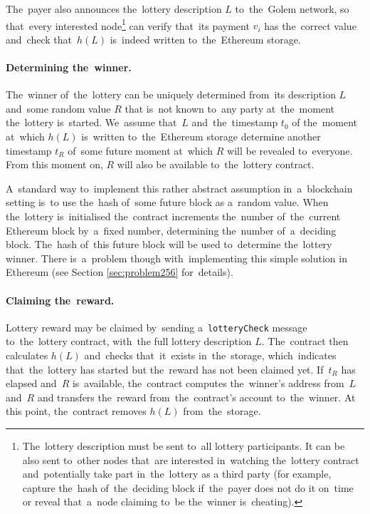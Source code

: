 \documentclass[a4paper]{article}
\newcommand{\lotteryhash}[1]{h({#1})}
\begin{document}
    The~payer also announces the~lottery description $L$ to~the~Golem network, so that~every interested
    node\footnote{ The~lottery description must be sent to~all lottery participants. It can be also sent to~other
    nodes that~are interested in~watching the~lottery contract and~potentially take part in~the~lottery as a
    third party (for example, capture the~hash of~the~deciding block if~the~payer does not do it on~time or reveal
    that~a~node claiming to~be the~winner is~cheating).}
    can verify that~its payment $v_i$ has the~correct value and~check that~$\lotteryhash{L}$ is~indeed written to~the~Ethereum
    storage.

    \paragraph{Determining the~winner.}
    The~winner of~the~lottery can be uniquely determined from~its description $L$ and~some random value $R$ that
    is~not known to~any party at~the~moment the~lottery is~started. We~assume that~$L$ and~the~timestamp $t_0$ of
    the~moment at~which $\lotteryhash{L}$ is~written to~the~Ethereum storage determine another timestamp $t_R$ of~some future
    moment at~which $R$ will be revealed to~everyone. From this moment on, $R$ will also be available to~the~lottery
    contract.

    A~standard way to~implement this rather abstract assumption in~a~blockchain setting is~to use the~hash of~some
    future block as a~random value. When the~lottery is~initialised the~contract increments the~number of~the~current
    Ethereum block by~a~fixed number, determining the~number of~a~deciding block. The~hash of~this future block will
    be used to~determine the~lottery winner. There is~a~problem though with~implementing this simple solution in
    Ethereum (see Section \ref{sec:problem256} for~details).

    \paragraph{Claiming the~reward.}
    Lottery reward may be claimed by~sending a~\texttt{lotteryCheck} message to~the~lottery contract, with~the
    full lottery description $L$. The~contract then calculates $\lotteryhash{L}$ and~checks that~it~exists in~the~storage,
    which~indicates that~the~lottery has started but the~reward has not been claimed yet.
    If~$t_R$ has elapsed and~$R$ is~available, the~contract computes the~winner's address from~$L$ and~$R$ and
    transfers the~reward from~the~contract's account to~the~winner. At this point, the~contract removes $\lotteryhash{L}$
    from~the~storage.
\end{document}
